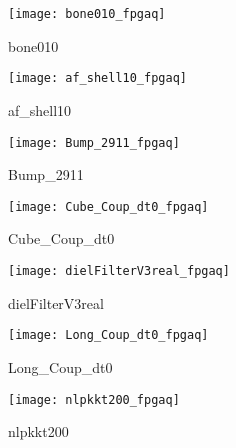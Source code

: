 \begin{figure}[H]
    \begin{center}
        \texttt{[image: bone010\_fpgaq]}
    \end{center}
    \caption{bone010}
    \label{fig:bone010_fpgaq}
\end{figure}

\begin{figure}[H]
    \begin{center}
        \texttt{[image: af\_shell10\_fpgaq]}
    \end{center}
    \caption{af\_shell10}
    \label{fig:af_shell10_fpgaq}
\end{figure}

\begin{figure}[H]
    \begin{center}
        \texttt{[image: Bump\_2911\_fpgaq]}
    \end{center}
    \caption{Bump\_2911}
    \label{fig:Bump_2911_fpgaq}
\end{figure}

\begin{figure}[H]
    \begin{center}
        \texttt{[image: Cube\_Coup\_dt0\_fpgaq]}
    \end{center}
    \caption{Cube\_Coup\_dt0}
    \label{fig:Cube_Coup_dt0_fpgaq}
\end{figure}

\begin{figure}[H]
    \begin{center}
        \texttt{[image: dielFilterV3real\_fpgaq]}
    \end{center}
    \caption{dielFilterV3real}
    \label{fig:dielFilterV3real_fpgaq}
\end{figure}


\begin{figure}[H]
    \begin{center}
        \texttt{[image: Long\_Coup\_dt0\_fpgaq]}
    \end{center}
    \caption{Long\_Coup\_dt0}
    \label{fig:Long_Coup_dt0_fpgaq}
\end{figure}

\begin{figure}[H]
    \begin{center}
        \texttt{[image: nlpkkt200\_fpgaq]}
    \end{center}
    \caption{nlpkkt200}
    \label{fig:nlpkkt200_fpgaq}
\end{figure}

